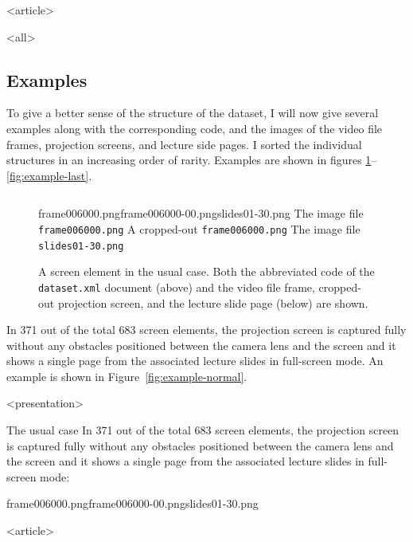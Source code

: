 \mode
<article>


\mode
<all>{%
\subsection{Examples}
\label{sec:examples}}
To give a better sense of the structure of the dataset, I will now give several
examples along with the corresponding  code, and the images of the
video file frames, projection screens, and lecture side pages. I sorted the
individual structures in an increasing order of rarity. Examples are shown in
figures \ref{fig:example-first}--\ref{fig:example-last}.

\begin{description}
  \begin{figure}
    \inputminted{xml}{fig/examples/normal/example.xml}\par
      {frame006000.png}{frame006000-00.png}{slides01-30.png}%
      {The image file \texttt{frame006000.png}}%
      {A cropped-out \texttt{frame006000.png}}%
      {The image file \texttt{slides01-30.png}}
    \caption{A screen element in the usual case. Both the abbreviated code
      of the \texttt{dataset.xml} document (above) and the video file frame,
      cropped-out projection screen, and the lecture slide page (below) are
      shown.}
    \label{fig:example-normal}
    \label{fig:example-first}
  \end{figure}
  \item[The usual case] In 371 out of the total 683 screen elements, the
    projection screen is captured fully without any obstacles positioned
    between the camera lens and the screen and it shows a single page from the
    associated lecture slides in full-screen mode. An example is shown in
    Figure~\ref{fig:example-normal}.

\mode
<presentation>

  \begin{frame}{The usual case}
    In 371 out of the total 683 screen elements, the projection screen is
    captured fully without any obstacles positioned between the camera lens and
    the screen and it shows a single page from the associated lecture slides in
    full-screen mode:

      {frame006000.png}{frame006000-00.png}{slides01-30.png}
  \end{frame}

\mode
<article>


\end{description}

